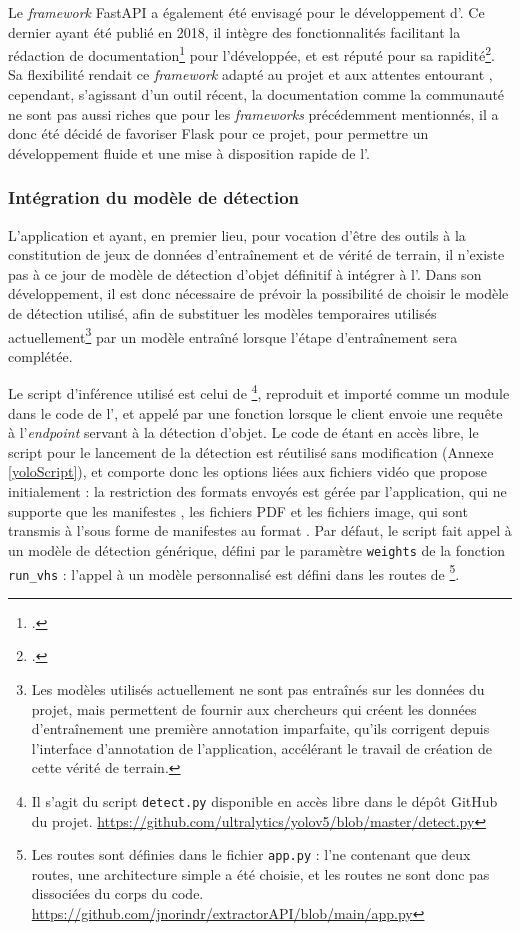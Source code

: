 	Le \textit{framework} FastAPI a également été envisagé pour le développement d'\exapi. Ce dernier ayant été publié en 2018, il intègre des fonctionnalités facilitant la rédaction de documentation\footcite{FastAPIFrameworkPython2023} pour l'\api développée, et est réputé pour sa rapidité\footcite{sandyChoosingDjangoFlask}. Sa flexibilité rendait ce \textit{framework} adapté au projet \eida et aux attentes entourant \exapi, cependant, s'agissant d'un outil récent, la documentation comme la communauté ne sont pas aussi riches que pour les \textit{frameworks} précédemment mentionnés, il a donc été décidé de favoriser Flask pour ce projet, pour permettre un développement fluide et une mise à disposition rapide de l'\api.
	
	\subsubsection{Intégration du modèle de détection}
	L'application \eida et \exapi ayant, en premier lieu, pour vocation d'être des outils à la constitution de jeux de données d'entraînement et de vérité de terrain, il n'existe pas à ce jour de modèle de détection d'objet définitif à intégrer à l'\api. Dans son développement, il est donc nécessaire de prévoir la possibilité de choisir le modèle de détection utilisé, afin de substituer les modèles temporaires utilisés actuellement\footnote{Les modèles utilisés actuellement ne sont pas entraînés sur les données du projet, mais permettent de fournir aux chercheurs qui créent les données d'entraînement une première annotation imparfaite, qu'ils corrigent depuis l'interface d'annotation de l'application, accélérant le travail de création de cette vérité de terrain.} par un modèle entraîné lorsque l'étape d'entraînement sera complétée.
	
	Le script d’inférence utilisé est celui de \yolov\footnote{Il s'agit du script \texttt{detect.py} disponible en accès libre dans le dépôt GitHub du projet. \url{https://github.com/ultralytics/yolov5/blob/master/detect.py}}, reproduit et importé comme un module dans le code de l'\api, et appelé par une fonction lorsque le client envoie une requête à l'\textit{endpoint} servant à la détection d'objet. Le code de \yolov étant en accès libre, le script pour le lancement de la détection est réutilisé sans modification (Annexe \ref{yoloScript}), et comporte donc les options liées aux fichiers vidéo que \yolo propose initialement : la restriction des formats envoyés est gérée par l'application, qui ne supporte que les manifestes \iiif, les fichiers PDF et les fichiers image, qui sont transmis à l'\api sous forme de manifestes \iiif au format \json. Par défaut, le script fait appel à un modèle de détection \yolov générique, défini par le paramètre \texttt{weights} de la fonction \texttt{run\_vhs} : l'appel à un modèle personnalisé est défini dans les routes de \api\footnote{Les routes sont définies dans le fichier \texttt{app.py} : l'\api ne contenant que deux routes, une architecture simple a été choisie, et les routes ne sont donc pas dissociées du corps du code. \url{https://github.com/jnorindr/extractorAPI/blob/main/app.py}}.
	
